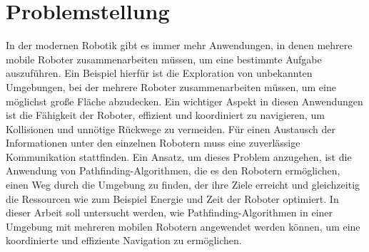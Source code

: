\label{ch:einleitung}
\section{Problemstellung}
\label{sec:problemstellung}
In der modernen Robotik gibt es immer mehr Anwendungen, in denen mehrere mobile Roboter zusammenarbeiten müssen, um eine bestimmte Aufgabe auszuführen. Ein Beispiel hierfür ist die Exploration von unbekannten Umgebungen, bei der mehrere Roboter zusammenarbeiten müssen, um eine möglichst große Fläche abzudecken. Ein wichtiger Aspekt in diesen Anwendungen ist die Fähigkeit der Roboter, effizient und koordiniert zu navigieren, um Kollisionen und unnötige Rückwege zu vermeiden. Für einen Austausch der Informationen unter den einzelnen Robotern muss eine zuverlässige Kommunikation stattfinden.
Ein Ansatz, um dieses Problem anzugehen, ist die Anwendung von Pathfinding-Algorithmen, die es den Robotern ermöglichen, einen Weg durch die Umgebung zu finden, der ihre Ziele erreicht und gleichzeitig die Ressourcen wie zum Beispiel Energie und Zeit der Roboter optimiert. In dieser Arbeit soll untersucht werden, wie Pathfinding-Algorithmen in einer Umgebung mit mehreren mobilen Robotern angewendet werden können, um eine koordinierte und effiziente Navigation zu ermöglichen. 

